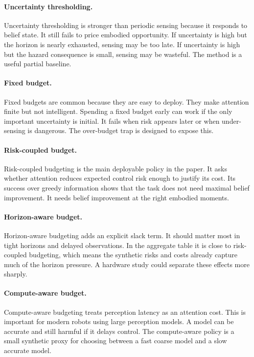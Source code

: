 \documentclass{article}
\begin{document}
\paragraph{Uncertainty thresholding.}
Uncertainty thresholding is stronger than periodic sensing because it responds
to belief state. It still fails to price embodied opportunity. If uncertainty
is high but the horizon is nearly exhausted, sensing may be too late. If
uncertainty is high but the hazard consequence is small, sensing may be
wasteful. The method is a useful partial baseline.

\paragraph{Fixed budget.}
Fixed budgets are common because they are easy to deploy. They make attention
finite but not intelligent. Spending a fixed budget early can work if the only
important uncertainty is initial. It fails when risk appears later or when
under-sensing is dangerous. The over-budget trap is designed to expose this.

\paragraph{Risk-coupled budget.}
Risk-coupled budgeting is the main deployable policy in the paper. It asks
whether attention reduces expected control risk enough to justify its cost.
Its success over greedy information shows that the task does not need maximal
belief improvement. It needs belief improvement at the right embodied moments.

\paragraph{Horizon-aware budget.}
Horizon-aware budgeting adds an explicit slack term. It should matter most in
tight horizons and delayed observations. In the aggregate table it is close to
risk-coupled budgeting, which means the synthetic risks and costs already
capture much of the horizon pressure. A hardware study could separate these
effects more sharply.

\paragraph{Compute-aware budget.}
Compute-aware budgeting treats perception latency as an attention cost. This
is important for modern robots using large perception models. A model can be
accurate and still harmful if it delays control. The compute-aware policy is a
small synthetic proxy for choosing between a fast coarse model and a slow
accurate model.
\end{document}
